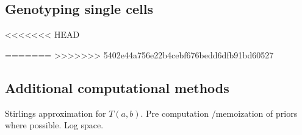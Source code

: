 \documentclass[../main.tex]{subfiles}
\begin{document}
\subsection{Genotyping single cells}


<<<<<<< HEAD

=======
>>>>>>> 5402e44a756e22b4cebf676bedd6dfb91bd60527
\subsection{Additional computational methods}
Stirlings approximation for $T(a,b)$. Pre computation /memoization of priors where possible. Log space.
\end{document}
